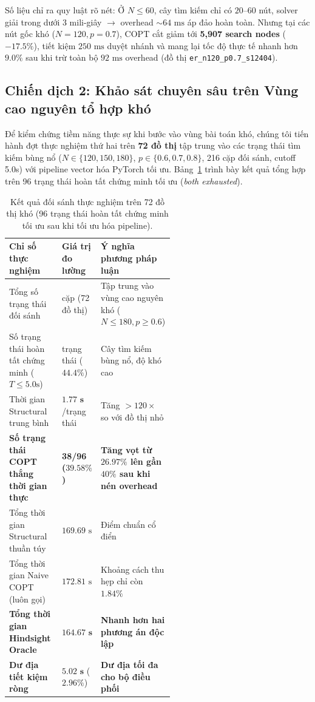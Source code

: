 \documentclass[11pt,a4paper]{article}
\begin{document}
Số liệu chỉ ra quy luật rõ nét: Ở $N \le 60$, cây tìm kiếm chỉ có $20\text{--}60$ nút, solver giải trong dưới 3 mili-giây $\to$ overhead $\sim 64\text{ ms}$ áp đảo hoàn toàn. Nhưng tại các nút gốc khó ($N=120, p=0.7$), COPT cắt giảm tới \textbf{5,907 search nodes} ($-17.5\%$), tiết kiệm $250\text{ ms}$ duyệt nhánh và mang lại tốc độ thực tế nhanh hơn \textbf{$9.0\%$} sau khi trừ toàn bộ $92\text{ ms}$ overhead (đồ thị \texttt{er\_n120\_p0.7\_s12404}).

\subsection{Chiến dịch 2: Khảo sát chuyên sâu trên Vùng cao nguyên tổ hợp khó}
Để kiểm chứng tiềm năng thực sự khi bước vào vùng bài toán khó, chúng tôi tiến hành đợt thực nghiệm thứ hai trên \textbf{72 đồ thị} tập trung vào các trạng thái tìm kiếm bùng nổ ($N \in \{120, 150, 180\}$, $p \in \{0.6, 0.7, 0.8\}$, 216 cặp đối sánh, cutoff 5.0s) với pipeline vector hóa PyTorch tối ưu. Bảng~\ref{tab:hard_benchmark} trình bày kết quả tổng hợp trên 96 trạng thái hoàn tất chứng minh tối ưu (\textit{both exhausted}).

\begin{table}[ht]
\centering
\footnotesize
\setlength{\tabcolsep}{4pt}
\caption{Kết quả đối sánh thực nghiệm trên 72 đồ thị khó (96 trạng thái hoàn tất chứng minh tối ưu sau khi tối ưu hóa pipeline).}
\label{tab:hard_benchmark}
\begin{tabularx}{\linewidth}{
  >{\raggedright\arraybackslash}p{0.32\linewidth}
  >{\centering\arraybackslash}p{0.22\linewidth}
  >{\raggedright\arraybackslash}X}
\toprule
Chỉ số thực nghiệm & Giá trị đo lường & Ý nghĩa phương pháp luận \\
\midrule
Tổng số trạng thái đối sánh & 216 cặp (72 đồ thị) & Tập trung vào vùng cao nguyên khó ($N \le 180, p \ge 0.6$) \\
Số trạng thái hoàn tất chứng minh ($T \le 5.0\text{s}$) & 96 trạng thái ($44.4\%$) & Cây tìm kiếm bùng nổ, độ khó cao \\
Thời gian Structural trung bình & $\mathbf{1.77\text{ s}}$/trạng thái & Tăng $>120\times$ so với đồ thị nhỏ \\
\midrule
\textbf{Số trạng thái COPT thắng thời gian thực} & \textbf{38/96 ($\mathbf{39.58\%}$)} & \textbf{Tăng vọt từ $26.97\%$ lên gần $40\%$ sau khi nén overhead} \\
Tổng thời gian Structural thuần túy & $169.69\text{ s}$ & Điểm chuẩn cổ điển \\
Tổng thời gian Naive COPT (luôn gọi) & $172.81\text{ s}$ & Khoảng cách thu hẹp chỉ còn $1.84\%$ \\
\textbf{Tổng thời gian Hindsight Oracle} & $\mathbf{164.67\text{ s}}$ & \textbf{Nhanh hơn hai phương án độc lập} \\
\midrule
\textbf{Dư địa tiết kiệm ròng} & $\mathbf{5.02\text{ s}}$ ($\mathbf{2.96\%}$) & \textbf{Dư địa tối đa cho bộ điều phối} \\
\bottomrule
\end{tabularx}
\end{table}
\end{document}
